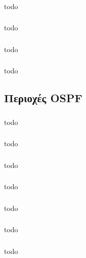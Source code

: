 \documentclass[a4paper, 12pt]{article}
\begin{document}
		\subsubsection{}
			todo

		\subsubsection{}
			todo

		\subsubsection{}
			todo

		\subsubsection{}
			todo

	\subsection{Περιοχές OSPF}

		\subsubsection{}
			todo

		\subsubsection{}
			todo

		\subsubsection{}
			todo

		\subsubsection{}
			todo

		\subsubsection{}
			todo

		\subsubsection{}
			todo

		\subsubsection{}
			todo
\end{document}
